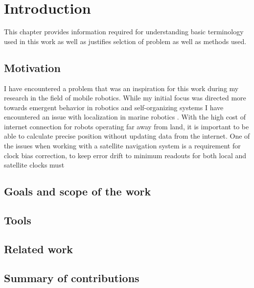 \chapter{Introduction}
This chapter provides information required for understanding basic terminology used in this
work as well as justifies selction of problem as well as methods used.


\FloatBarrier
\section{Motivation}
I have encountered a problem that was an inspiration for this work during my research in the 
field of mobile robotics.
While my initial focus was directed more towards emergent behavior in robotics and self-organizing 
systems \cite{Gnys2017}\cite{Gnys2019} I have encountered an issue with localization in marine 
robotics \cite{Cabrera-Gamez2014}.
With the high cost of internet connection for robots operating far away from land, 
it is important to be able to calculate precise position without updating data from the internet.
One of the issues when working with a satellite navigation system is a requirement for clock bias
correction, to keep error drift to minimum readouts for both local and satellite clocks must

\FloatBarrier
\section{Goals and scope of the work}

\FloatBarrier
\section{Tools}


\FloatBarrier
\section{Related work}


\FloatBarrier
\section{Summary of contributions}

